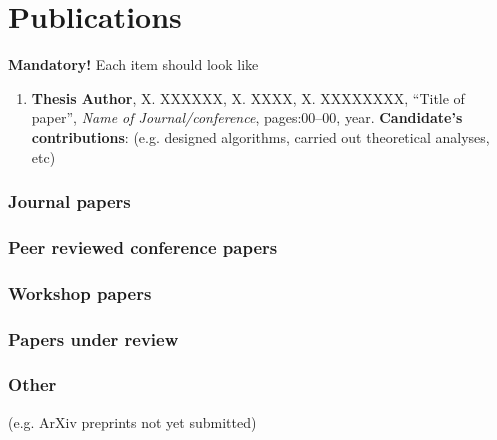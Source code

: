 \chapter{Publications}
\label{app:publications}

\textbf{Mandatory!}
Each item should look like
\begin{enumerate}
\item \textbf{Thesis Author}, X. XXXXXX, X. XXXX, X. XXXXXXXX, ``Title
  of paper'', \textit{Name of Journal/conference}, pages:00--00, year.
  \textbf{Candidate's contributions}: (e.g. designed algorithms,
  carried out theoretical analyses, etc)
\end{enumerate}

\subsection*{Journal papers}
\subsection*{Peer reviewed conference papers}
\subsection*{Workshop papers}
\subsection*{Papers under review}
\subsection*{Other}
(e.g. ArXiv preprints not yet submitted)


